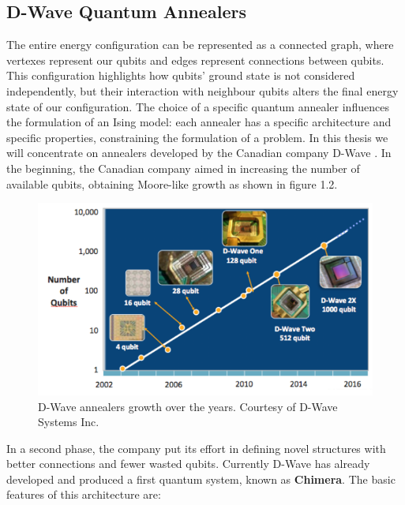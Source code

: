 \subsection{D-Wave Quantum Annealers}

The entire energy configuration can be represented as a connected graph, where vertexes represent our qubits and edges represent connections between qubits. This configuration highlights how qubits' ground state is not considered independently, but their interaction with neighbour qubits alters the final energy state of our configuration. The choice of a specific quantum annealer influences the formulation of an Ising model: each annealer has a specific architecture and specific properties, constraining the formulation of a problem. In this thesis we will concentrate on annealers developed by the Canadian company D-Wave \cite{Dwave}. In the beginning, the Canadian company aimed in increasing the number of available qubits, obtaining Moore-like growth as shown in figure 1.2. 
\begin{figure}[t]
	\begin{center}
	\includegraphics{images/DwaveMoore.PNG}
	\caption{D-Wave annealers growth over the years. Courtesy of D-Wave Systems Inc.}
	\end{center}
\end{figure}
In a second phase, the company put its effort in defining novel structures with better connections and fewer wasted qubits. Currently D-Wave has already developed and produced a first quantum system, known as \textbf{Chimera}. The basic features of this architecture are:

